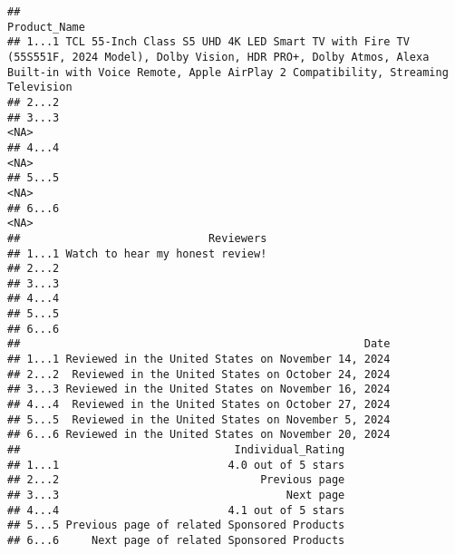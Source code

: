 \documentclass[
  11pt,
]{article}
\begin{document}
\begin{verbatim}
##                                                                                                                                                                                                  Product_Name
## 1...1 TCL 55-Inch Class S5 UHD 4K LED Smart TV with Fire TV (55S551F, 2024 Model), Dolby Vision, HDR PRO+, Dolby Atmos, Alexa Built-in with Voice Remote, Apple AirPlay 2 Compatibility, Streaming Television
## 2...2                                                                                                                                                                                                        
## 3...3                                                                                                                                                                                                    <NA>
## 4...4                                                                                                                                                                                                    <NA>
## 5...5                                                                                                                                                                                                    <NA>
## 6...6                                                                                                                                                                                                    <NA>
##                             Reviewers
## 1...1 Watch to hear my honest review!
## 2...2                                
## 3...3                                
## 4...4                                
## 5...5                                
## 6...6                                
##                                                     Date
## 1...1 Reviewed in the United States on November 14, 2024
## 2...2  Reviewed in the United States on October 24, 2024
## 3...3 Reviewed in the United States on November 16, 2024
## 4...4  Reviewed in the United States on October 27, 2024
## 5...5  Reviewed in the United States on November 5, 2024
## 6...6 Reviewed in the United States on November 20, 2024
##                                 Individual_Rating
## 1...1                          4.0 out of 5 stars
## 2...2                               Previous page
## 3...3                                   Next page
## 4...4                          4.1 out of 5 stars
## 5...5 Previous page of related Sponsored Products
## 6...6     Next page of related Sponsored Products

\end{verbatim}
\end{document}
